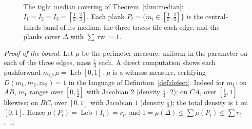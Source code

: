 \documentclass[11pt,reqno]{amsart}
\theoremstyle{plain}
\theoremstyle{definition}
\theoremstyle{remark}
\newcommand{\rw}{\operatorname{rw}}
\newcommand{\Leb}{\operatorname{Leb}}
\begin{document}
\begin{figure}[ht]
\centering
{}
\caption{The tight median covering of Theorem~\ref{thm:median}:
$I_1=I_2=I_3=[\tfrac13,\tfrac23]$. Each plank $P_i=\{m_i\in[\tfrac13,\tfrac23]\}$
is the central-thirds band of its median; the three traces tile each edge, and
the planks cover $\Delta$ with $\sum\rw=1$.}
\label{fig:median}
\end{figure}
\begin{proof}[Proof of the bound]
Let $\mu$ be the perimeter measure: uniform in the parameter on each of the three
edges, mass $\tfrac13$ each. A direct computation shows each pushforward
$m_{i\#}\mu=\Leb[0,1]$: $\mu$ is a witness measure, certifying
$D(m_1,m_2,m_3)=1$ in the language of Definition~\ref{def:defect}. Indeed for $m_1$: on $AB$, $m_1$ ranges over $[0,\tfrac12]$
with Jacobian $2$ (density $\tfrac13\cdot2$); on $CA$, over $[\tfrac12,1]$ likewise;
on $BC$, over $[0,1]$ with Jacobian $1$ (density $\tfrac13$); the total density is
$1$ on $[0,1]$. Hence $\mu(P_i)=\Leb(I_i)=r_i$,
and $1=\mu(\Delta)\le\sum\mu(P_i)\le\sum r_i$.
\end{proof}
\end{document}

